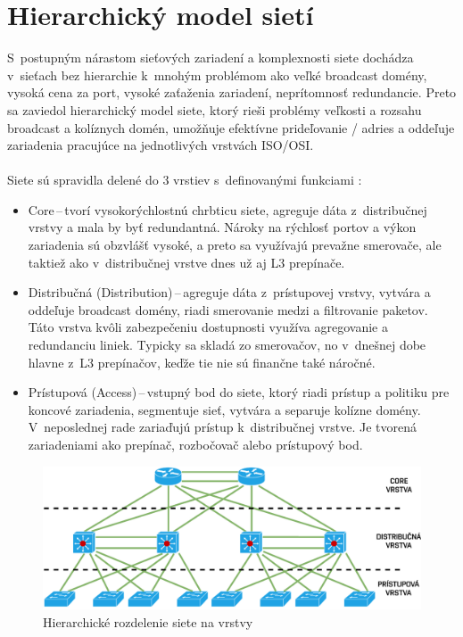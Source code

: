 \section{Hierarchický model sietí}
\label{hierarchicky-model}
S~postupným nárastom sieťových zariadení a komplexnosti siete dochádza v~sieťach bez hierarchie k~mnohým problémom ako veľké broadcast domény, vysoká cena za port, vysoké zaťaženia zariadení, neprítomnosť redundancie. Preto sa zaviedol hierarchický model siete, ktorý rieši problémy veľkosti a rozsahu broadcast a kolíznych domén, umožňuje efektívne prideľovanie  /  adries a oddeľuje zariadenia pracujúce na jednotlivých vrstvách ISO/OSI.  
\\\\
\noindent
Siete sú spravidla delené do 3 vrstiev s~definovanými funkciami \cite{Lammle2013}:
\begin{itemize}
	\item Core\,--\,tvorí vysokorýchlostnú chrbticu siete, agreguje dáta z~distribučnej vrstvy a mala by byť redundantná. Nároky na rýchlosť portov a výkon zariadenia sú obzvlášť vysoké, a preto sa využívajú prevažne smerovače, ale taktiež ako v~distribučnej vrstve dnes už aj L3 prepínače.
	\item Distribučná (Distribution)\,--\,agreguje dáta z~prístupovej vrstvy, vytvára a oddeľuje broadcast domény, riadi smerovanie medzi  a  filtrovanie paketov. Táto vrstva kvôli zabezpečeniu dostupnosti využíva agregovanie  a redundanciu liniek. Typicky sa skladá zo smerovačov, no v~dnešnej dobe hlavne z~L3 prepínačov, keďže tie nie sú finančne také náročné. 
	\item Prístupová (Access)\,--\,vstupný bod do siete, ktorý riadi prístup a politiku pre koncové zariadenia, segmentuje sieť, vytvára a separuje kolízne domény. V~neposlednej rade zariaďujú prístup k~distribučnej vrstve. Je tvorená zariadeniami ako prepínač, rozbočovač alebo prístupový bod.
\end{itemize} 
\vspace{2em}
\begin{figure}[H]
	\begin{center}
		\includegraphics[scale=0.9]{obrazky/hierarchy_network.pdf}
	\end{center}

	\caption[Hierarchické rozdelenie siete na vrstvy]{Hierarchické rozdelenie siete na vrstvy}
	\label{fig:net-hierarchy}
\end{figure} 

